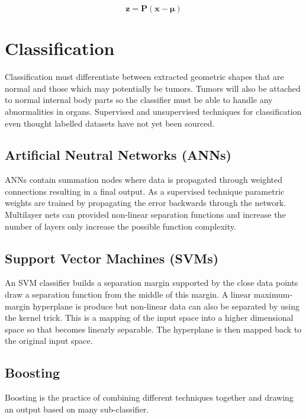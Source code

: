 \documentclass[journal]{IEEEtran}
\begin{document}
\begin{equation}
	\boldsymbol{z} = \boldsymbol{P}(\boldsymbol{x} - \boldsymbol{\mu})
	\label{eqn:PCA}
\end{equation}












\section{Classification}
\label{sec:class}

Classification must differentiate between extracted geometric shapes that are normal and those which may potentially be tumors.
Tumors will also be attached to normal internal body parts so the classifier must be able to handle any abnormalities in organs.
Supervised and unsupervised techniques for classification even thought labelled datasets have not yet been sourced.


\subsection{Artificial Neutral Networks (ANNs)}
ANNs contain summation nodes where data is propagated through weighted connections resulting in a final output. 
As a supervised technique parametric weights are trained by propagating the error backwards through the network.
Multilayer nets can provided non-linear separation functions and increase the number of layers only increase the possible function complexity.



\subsection{Support Vector Machines (SVMs)}
An SVM classifier builds a separation margin supported by the close data points draw a separation function from the middle of this margin.
A linear maximum-margin hyperplane is produce but non-linear data can also be separated by using the kernel trick. 
This is a mapping of the input space into a higher dimensional space so that becomes linearly separable.
The hyperplane is then mapped back to the original input space.



\subsection{Boosting}
Boosting is the practice of combining different techniques together and drawing an output based on many sub-classifier.
\end{document}
